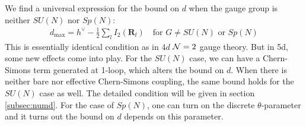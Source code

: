 \documentclass[letterpaper, 11pt]{article}
\def\CN{{\cal N}}
\begin{document}
We find a universal expression for the bound on $d$ when the gauge group is neither $SU(N)$ nor $Sp(N)$:
\begin{align}
  \label{eq:cor5d-dmax}
 d_{\textrm{max}} =  h^\vee -\frac{1}{2}\sum_l I_2(\mathbf{R}_l) \quad \textrm{for } G \neq SU(N) \textrm{ or } Sp(N) 
\end{align}
This is essentially identical condition as in $4d$ $\CN=2$ gauge theory. But in 5d, some new effects come into play. 
For the $SU(N)$ case, we can have a Chern-Simons term generated at 1-loop, which alters the bound on $d$. When there is neither bare nor effective Chern-Simons coupling, the same bound holds for the $SU(N)$ case as well. The detailed condition will be given in section \ref{subsec:numd}. For the case of $Sp(N)$, one can turn on the discrete $\theta$-parameter and it turns out the bound on $d$ depends on this parameter. 
\end{document}
